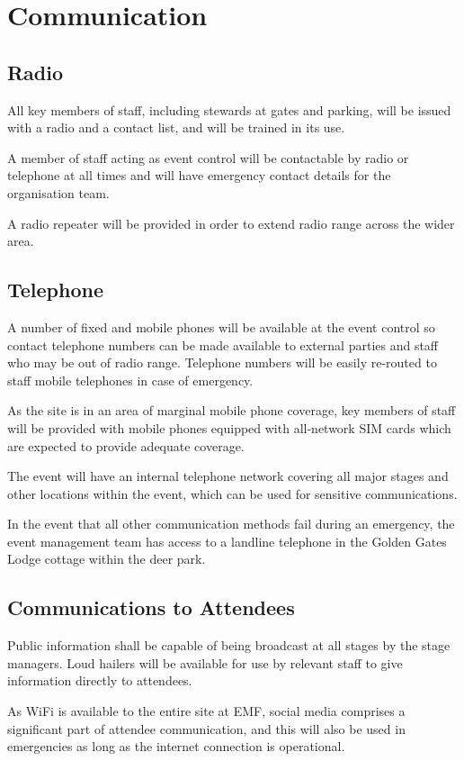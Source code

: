 \section{Communication}

\subsection{Radio}
All key members of staff, including stewards at gates and parking,
will be issued with a radio and a contact list, and will be trained in its use.

A member of staff acting as event control will be contactable by
radio or telephone at all times and will have emergency contact details for the
organisation team.

A radio repeater will be provided in order to extend radio range across the wider
area.

\subsection{Telephone}
A number of fixed and mobile phones will be available at the event control so
contact telephone numbers can be made available to external parties and staff
who may be out of radio range. Telephone numbers will be easily re-routed to
staff mobile telephones in case of emergency.

As the site is in an area of marginal mobile phone coverage, key members of staff
will be provided with mobile phones equipped with all-network SIM cards which
are expected to provide adequate coverage.

The event will have an internal telephone network covering all major stages and
other locations within the event, which can be used for sensitive
communications.

In the event that all other communication methods fail during an emergency, the
event management team has access to a landline telephone in the Golden Gates
Lodge cottage within the deer park.

\subsection{Communications to Attendees}\label{attendeecomms}
Public information shall be capable of being broadcast at all stages by the
stage managers. Loud hailers will be available for use by relevant staff to
give information directly to attendees.

As WiFi is available to the entire site at EMF, social media comprises a
significant part of attendee communication, and this will also be used in
emergencies as long as the internet connection is operational.

